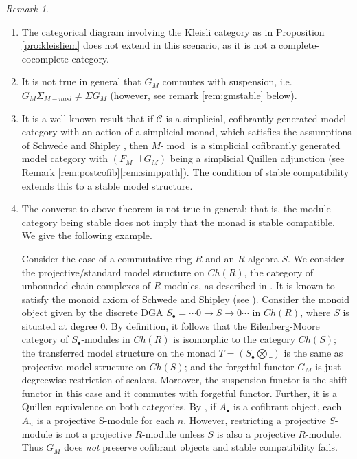 \documentclass{article}
\newcommand{\cC}{\mathcal{C}}
\newcommand{\module}[2][]{#2\text{-}\modop_{#1}}
\DeclareMathOperator{\modop}{mod}
\theoremstyle{definition}
\theoremstyle{remark}
\newtheorem{remark}[theorem]{Remark}
\begin{document}
\begin{remark} \label{rmk:stabcomp}
\begin{enumerate}
    \item The categorical diagram involving the Kleisli category as in Proposition \ref{pro:kleisliem} does not extend in this scenario, 
      as it is not a complete-cocomplete category.
    \item It is not true in general that $G_{M}$ commutes with suspension, i.e. $G_{M}\Sigma_{M-mod} \neq \Sigma G_{M}$ (however, see remark \ref{rem:gmstable} below).
    \item \label{itm:simmonad} It is a well-known result that if $\cC$ is a simplicial,  cofibrantly generated model category 
    with an action of a simplicial monad, which satisfies the assumptions of Schwede and Shipley \cite[lemma 2.3]{MR1734325},
    then $\module{M}$ is a simplicial cofibrantly generated model category with 
    $(F_{M} \dashv G_{M})$ being a simplicial Quillen adjunction (see Remark \ref{rem:postcofib}\eqref{rem:simppath}). The condition of stable compatibility
    extends this to a stable model structure.
    \item  \label{itm:chRasamc} 
    The converse to above theorem is not true in general; that is, the module category
    being stable does not imply that the monad is stable compatible. We give the
    following example.
    
    Consider the case of a commutative ring $R$ and an $R$-algebra $S$. We consider the projective/standard model structure on $Ch(R)$, the category of unbounded chain complexes of $R$-modules, as described in \cite[2.3.11]{MR1650134}. It is known to satisfy the monoid axiom of Schwede and Shipley (see \cite[section 5, \textit{Chain complexes}]{MR1734325}).
    Consider the monoid object given by the discrete DGA $S_{\bullet}= \cdots 0 \rightarrow S \rightarrow 0 \cdots$ in $Ch(R)$, where $S$ is situated at degree $0$.
    By definition, it follows that the Eilenberg-Moore category of 
    $S_{\bullet}$-modules in $Ch(R)$ is isomorphic to the category $Ch(S)$;
    the transferred model structure on the monad $T=(S_{\bullet} \bigotimes \_)$ 
    is the same as projective model structure on $Ch(S)$;
    and the forgetful functor $G_{M}$ is just degreewise restriction of scalars.
    Moreover, the suspension functor is the shift functor in this case
    and it commutes with forgetful functor. Further, it is a Quillen equivalence on both categories. By \cite[2.3.6]{MR1650134}, if $A_{\bullet}$ is a cofibrant object,
    each $A_{n}$ is a projective S-module for each $n$. However, restricting
    a projective $S$-module is not a projective $R$-module unless 
    $S$ is also a projective $R$-module. Thus $G_M$ does \emph{not} preserve cofibrant
    objects and stable compatibility fails.
\end{enumerate}
\end{remark}
\end{document}
